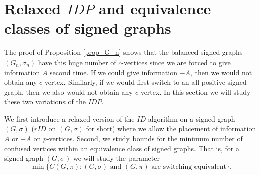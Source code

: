 \documentclass[a4paper,11pt]{article}
\theoremstyle{remark}
\begin{document}
\section{Relaxed $IDP$ and equivalence classes of signed graphs} \label{Sec: Equivalence Classes}

The proof of Proposition \ref{prop_G_n} shows that
the balanced signed graphs $(G_n, \sigma_n)$ have this huge number of 
$c$-vertices since we are forced to give information $A$ 
second time. If we could give information $-A$, then we would not obtain any $c$-vertex. Similarly, if we would first switch to an all positive signed graph, then we also would not obtain any $c$-vertex. In this section we will
study these two variations of the $IDP$.

We first introduce a relaxed version of the $ID$ algorithm on a signed graph $(G,\sigma)$
($rID$ on $(G,\sigma)$ for short) where we
allow the placement of information $A$ or $-A$ on $p$-vertices. 
Second, we study bounds for the minimum number of confused vertices 
within an equivalence class of signed graphs. That is, for a signed graph
$(G,\sigma)$ we will study the parameter 
$$\min \{C(G,\pi) \colon (G,\sigma) \text{ and } (G,\pi) \text{ are switching equivalent} \}.$$ 
\end{document}
